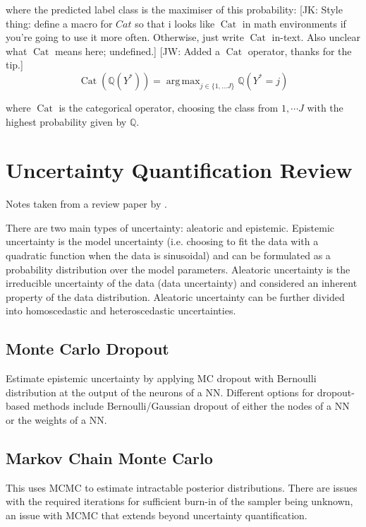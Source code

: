 \documentclass[twoside,11pt]{article}
\newcommand{\jk}[1]{{\color{blue} [JK: #1]}}
\newcommand{\jw}[1]{{\color{gray} [JW: #1]}}
\newcommand{\Cat}{\operatorname{Cat}}
\DeclareMathOperator*{\argmax}{arg\,max}
\begin{document}
where the predicted label class is the maximiser  of this probability:
%
\jk{Style thing: define a macro for $Cat$ so that i looks like  $\operatorname{Cat}$ in math environments if you're going to use it more often. Otherwise, just write $\operatorname{Cat}$ in-text. Also unclear what $\operatorname{Cat}$ means here; undefined.}
\jw{Added a $\Cat$ operator, thanks for the tip.}
%
\[\Cat(\mathbb{Q}(Y^*)) = \argmax_{j \in \{1, \dots J\}} \mathbb{Q}(Y^* = j)\]

where $\Cat$ is the categorical operator, choosing the class from $1, \cdots J$ with the highest probability given by $\mathbb{Q}$.

\section{Uncertainty Quantification Review}\label{sec:uncertainty-quantification-review}
Notes taken from a review paper by \cite{abdar2021review}.

There are two main types of uncertainty: aleatoric and epistemic.
Epistemic uncertainty is the model uncertainty (i.e. choosing to fit the data with a quadratic function when the data is sinusoidal) and can be formulated as a probability distribution over the model parameters.
Aleatoric uncertainty is the irreducible uncertainty of the data (data uncertainty) and considered an inherent property of the data distribution.
Aleatoric uncertainty can be further divided into homoscedastic and heteroscedastic uncertainties.

\subsection{Monte Carlo Dropout}\label{subsec:monte-carlo-dropout}
Estimate epistemic uncertainty by applying MC dropout with Bernoulli distribution at the output of the neurons of a NN.
Different options for dropout-based methods include Bernoulli/Gaussian dropout of either the nodes of a NN or the weights of a NN.

\subsection{Markov Chain Monte Carlo}\label{subsec:markov-chain-monte-carlo}
This uses MCMC to estimate intractable posterior distributions.
There are issues with the required iterations for sufficient burn-in of the sampler being unknown, an issue with MCMC that extends beyond uncertainty quantification.
\end{document}
